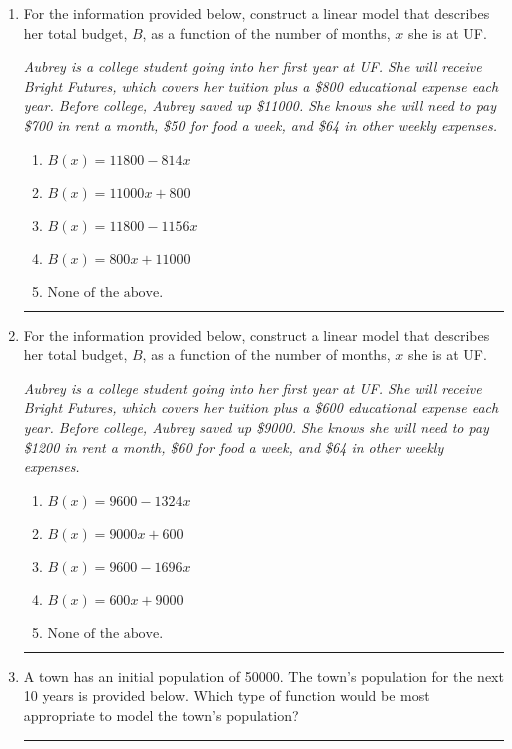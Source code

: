 \documentclass[14pt]{extbook}
\newcommand{\litem}[1]{\item#1\hspace*{-1cm}\rule{\textwidth}{0.4pt}}
\begin{document}
\begin{enumerate}
{\begin{enumerate}[label=\Alph*.]
\end{enumerate} }
\litem{
For the information provided below, construct a linear model that describes her total budget, $B$, as a function of the number of months, $x$ she is at UF.
\begin{center}
    \textit{ Aubrey is a college student going into her first year at UF. She will receive Bright Futures, which covers her tuition plus a \$800 educational expense each year. Before college, Aubrey saved up \$11000. She knows she will need to pay \$700 in rent a month, \$50 for food a week, and \$64 in other weekly expenses. }
\end{center}
\begin{enumerate}[label=\Alph*.]
\item \( B(x) = 11800 - 814 x \)
\item \( B(x) = 11000 x + 800 \)
\item \( B(x) = 11800 - 1156 x \)
\item \( B(x) = 800 x + 11000 \)
\item \( \text{None of the above.} \)

\end{enumerate} }
\litem{
For the information provided below, construct a linear model that describes her total budget, $B$, as a function of the number of months, $x$ she is at UF.
\begin{center}
    \textit{ Aubrey is a college student going into her first year at UF. She will receive Bright Futures, which covers her tuition plus a \$600 educational expense each year. Before college, Aubrey saved up \$9000. She knows she will need to pay \$1200 in rent a month, \$60 for food a week, and \$64 in other weekly expenses. }
\end{center}
\begin{enumerate}[label=\Alph*.]
\item \( B(x) = 9600 - 1324 x \)
\item \( B(x) = 9000 x + 600 \)
\item \( B(x) = 9600 - 1696 x \)
\item \( B(x) = 600 x + 9000 \)
\item \( \text{None of the above.} \)

\end{enumerate} }
\litem{
A town has an initial population of 50000. The town's population for the next 10 years is provided below. Which type of function would be most appropriate to model the town's population?


}
\end{enumerate}
\end{document}
